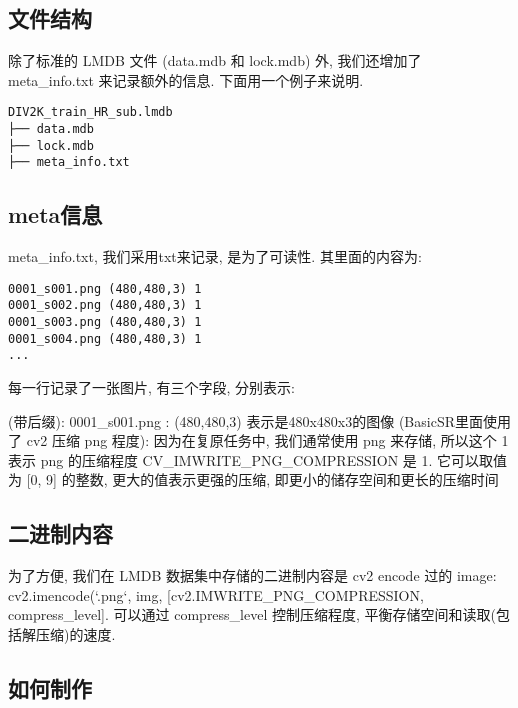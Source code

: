 \documentclass[../main.tex]{subfiles}
\begin{document}
\subsection{文件结构}

除了标准的 LMDB 文件 (data.mdb 和 lock.mdb) 外, 我们还增加了
meta\_info.txt 来记录额外的信息. 下面用一个例子来说明.

\begin{verbatim}
DIV2K_train_HR_sub.lmdb
├── data.mdb
├── lock.mdb
├── meta_info.txt
\end{verbatim}

\subsection{meta信息}

meta\_info.txt, 我们采用txt来记录, 是为了可读性. 其里面的内容为:
\begin{verbatim}
0001_s001.png (480,480,3) 1
0001_s002.png (480,480,3) 1
0001_s003.png (480,480,3) 1
0001_s004.png (480,480,3) 1
...
\end{verbatim}

每一行记录了一张图片, 有三个字段, 分别表示:
\begin{enumerate}
     (带后缀): 0001\_s001.png
    : (480,480,3) 表示是480x480x3的图像
     (BasicSR里面使用了 cv2 压缩 png 程度): 因为在复原任务中, 我们通常使用 png 来存储, 所以这个 1 表示 png 的压缩程度
          CV\_IMWRITE\_PNG\_COMPRESSION 是 1. 它可以取值为 [0, 9] 的整数, 更大的值表示更强的压缩, 即更小的储存空间和更长的压缩时间
\end{enumerate}

\subsection{二进制内容}

为了方便, 我们在 LMDB 数据集中存储的二进制内容是 cv2 encode 过的 image: cv2.imencode(`.png`, img, [cv2.IMWRITE\_PNG\_COMPRESSION, compress\_level]. 可以通过 compress\_level 控制压缩程度, 平衡存储空间和读取(包括解压缩)的速度.

\subsection{如何制作}
\end{document}
